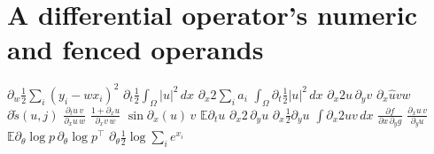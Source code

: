\documentclass{article}
\begin{document}
\section{A differential operator's numeric and fenced operands}
$\partial_w\frac{1}{2}\sum_i(y_i-wx_i)^2$ $\partial_t\frac{1}{2}\int_\Omega|u|^2\,dx$ $\partial_x 2\sum_i a_i$
$\int_\Omega\partial_t\frac{1}{2}|u|^2\,dx$ $\partial_x 2u\,\partial_y v$ $\partial_x\hat u v w$ $\partial\tilde s(u,j)$
$\frac{\partial_t u\,v}{\partial_x u\,w}$ $\frac{1+\partial_x u}{\partial_x v\,w}$ $\sin\partial_x(u)\,v$ $\mathbb{E}\partial_t u$
$\partial_x 2\,\partial_y u$ $\partial_x\frac12\partial_y u$ $\int\partial_x 2uv\,dx$ $\frac{\partial f}{\partial x\,\partial_y g}$ $\frac{\partial_x u\,v}{\partial_y u}$
$\mathbb{E}\partial_\theta\log p\,\partial_\theta\log p^\top$ $\partial_\theta\frac12\log\sum_i e^{x_i}$
\end{document}
